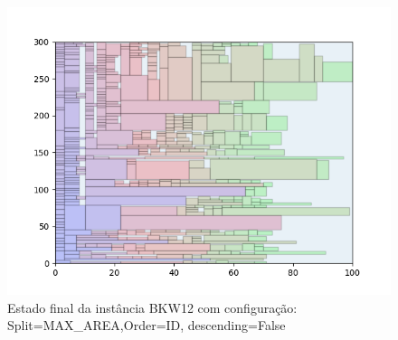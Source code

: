 \begin{figure}[H]
    \centering
    \caption[]{Estado final da instância BKW12 com configuração: Split=MAX_AREA,Order=ID, descending=False}
    \label{fig:bkw12-max_area-id-false}
    \includegraphics[scale=0.5]{output/figures/bkw/bkw12/max_area/id/false/000}
\end{figure}